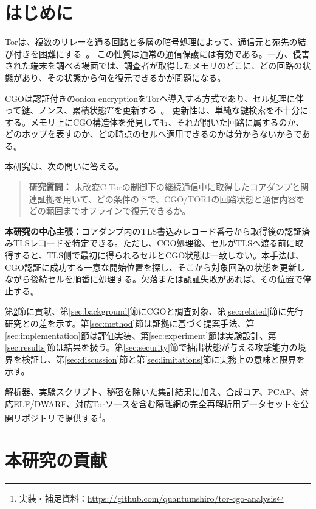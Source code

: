 \documentclass[10pt,a4paper]{ltjsarticle}
\newcommand{\torone}{\textsc{TOR1}}
\newcommand{\centralclaim}[1]{%
  \par\noindent\textbf{本研究の中心主張：}#1\par
}
\begin{document}
\section{はじめに}

Torは、複数のリレーを通る回路と多層の暗号処理によって、通信元と宛先の結び付きを困難にする~\cite{dingledine2004tor}。
この性質は通常の通信保護には有効である。一方、侵害された端末を調べる場面では、調査者が取得したメモリのどこに、どの回路の状態があり、その状態から何を復元できるかが問題になる。

CGOは認証付きのonion encryptionをTorへ導入する方式であり、セル処理に伴って鍵、ノンス、累積状態$T'$を更新する~\cite{torproposal359,degabriele2025cgo}。
更新性は、単純な鍵検索を不十分にする。メモリ上にCGO構造体を発見しても、それが開いた回路に属するのか、どのホップを表すのか、どの時点のセルへ適用できるのかは分からないからである。

本研究は、次の問いに答える。

\begin{quote}
\textbf{研究質問：} 未改変C Torの制御下の継続通信中に取得したコアダンプと関連証拠を用いて、どの条件の下で、CGO/\torone{}の回路状態と通信内容をどの範囲までオフラインで復元できるか。
\end{quote}

\centralclaim{コアダンプ内のTLS書込みレコード番号から取得後の認証済みTLSレコードを特定できる。ただし、CGO処理後、セルがTLSへ渡る前に取得すると、TLS側で最初に得られるセルとCGO状態は一致しない。本手法は、CGO認証に成功する一意な開始位置を探し、そこから対象回路の状態を更新しながら後続セルを順番に処理する。欠落または認証失敗があれば、その位置で停止する。}

第\ref{sec:contributions}節に貢献、第\ref{sec:background}節にCGOと調査対象、第\ref{sec:related}節に先行研究との差を示す。第\ref{sec:method}節は証拠に基づく提案手法、第\ref{sec:implementation}節は評価実装、第\ref{sec:experiment}節は実験設計、第\ref{sec:results}節は結果を扱う。第\ref{sec:security}節で抽出状態が与える攻撃能力の境界を検証し、第\ref{sec:discussion}節と第\ref{sec:limitations}節に実務上の意味と限界を示す。

解析器、実験スクリプト、秘密を除いた集計結果に加え、合成コア、PCAP、対応ELF/DWARF、対応Torソースを含む隔離網の完全再解析用データセットを公開リポジトリで提供する\footnote{実装・補足資料：\url{https://github.com/quantumshiro/tor-cgo-analysis}}。

\section{本研究の貢献}\label{sec:contributions}
\end{document}
